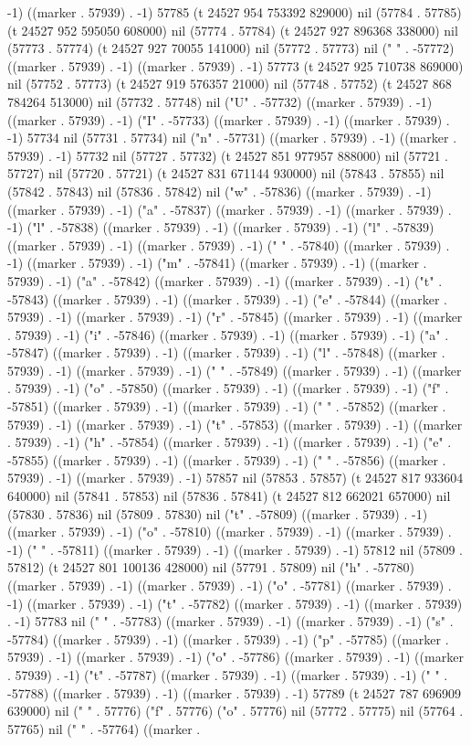 -1) ((marker . 57939) . -1) 57785 (t 24527 954 753392 829000) nil (57784 . 57785) (t 24527 952 595050 608000) nil (57774 . 57784) (t 24527 927 896368 338000) nil (57773 . 57774) (t 24527 927 70055 141000) nil (57772 . 57773) nil (" " . -57772) ((marker . 57939) . -1) ((marker . 57939) . -1) 57773 (t 24527 925 710738 869000) nil (57752 . 57773) (t 24527 919 576357 21000) nil (57748 . 57752) (t 24527 868 784264 513000) nil (57732 . 57748) nil ("U" . -57732) ((marker . 57939) . -1) ((marker . 57939) . -1) ("I" . -57733) ((marker . 57939) . -1) ((marker . 57939) . -1) 57734 nil (57731 . 57734) nil ("n" . -57731) ((marker . 57939) . -1) ((marker . 57939) . -1) 57732 nil (57727 . 57732) (t 24527 851 977957 888000) nil (57721 . 57727) nil (57720 . 57721) (t 24527 831 671144 930000) nil (57843 . 57855) nil (57842 . 57843) nil (57836 . 57842) nil ("w" . -57836) ((marker . 57939) . -1) ((marker . 57939) . -1) ("a" . -57837) ((marker . 57939) . -1) ((marker . 57939) . -1) ("l" . -57838) ((marker . 57939) . -1) ((marker . 57939) . -1) ("l" . -57839) ((marker . 57939) . -1) ((marker . 57939) . -1) (" " . -57840) ((marker . 57939) . -1) ((marker . 57939) . -1) ("m" . -57841) ((marker . 57939) . -1) ((marker . 57939) . -1) ("a" . -57842) ((marker . 57939) . -1) ((marker . 57939) . -1) ("t" . -57843) ((marker . 57939) . -1) ((marker . 57939) . -1) ("e" . -57844) ((marker . 57939) . -1) ((marker . 57939) . -1) ("r" . -57845) ((marker . 57939) . -1) ((marker . 57939) . -1) ("i" . -57846) ((marker . 57939) . -1) ((marker . 57939) . -1) ("a" . -57847) ((marker . 57939) . -1) ((marker . 57939) . -1) ("l" . -57848) ((marker . 57939) . -1) ((marker . 57939) . -1) (" " . -57849) ((marker . 57939) . -1) ((marker . 57939) . -1) ("o" . -57850) ((marker . 57939) . -1) ((marker . 57939) . -1) ("f" . -57851) ((marker . 57939) . -1) ((marker . 57939) . -1) (" " . -57852) ((marker . 57939) . -1) ((marker . 57939) . -1) ("t" . -57853) ((marker . 57939) . -1) ((marker . 57939) . -1) ("h" . -57854) ((marker . 57939) . -1) ((marker . 57939) . -1) ("e" . -57855) ((marker . 57939) . -1) ((marker . 57939) . -1) (" " . -57856) ((marker . 57939) . -1) ((marker . 57939) . -1) 57857 nil (57853 . 57857) (t 24527 817 933604 640000) nil (57841 . 57853) nil (57836 . 57841) (t 24527 812 662021 657000) nil (57830 . 57836) nil (57809 . 57830) nil ("t" . -57809) ((marker . 57939) . -1) ((marker . 57939) . -1) ("o" . -57810) ((marker . 57939) . -1) ((marker . 57939) . -1) (" " . -57811) ((marker . 57939) . -1) ((marker . 57939) . -1) 57812 nil (57809 . 57812) (t 24527 801 100136 428000) nil (57791 . 57809) nil ("h" . -57780) ((marker . 57939) . -1) ((marker . 57939) . -1) ("o" . -57781) ((marker . 57939) . -1) ((marker . 57939) . -1) ("t" . -57782) ((marker . 57939) . -1) ((marker . 57939) . -1) 57783 nil (" " . -57783) ((marker . 57939) . -1) ((marker . 57939) . -1) ("s" . -57784) ((marker . 57939) . -1) ((marker . 57939) . -1) ("p" . -57785) ((marker . 57939) . -1) ((marker . 57939) . -1) ("o" . -57786) ((marker . 57939) . -1) ((marker . 57939) . -1) ("t" . -57787) ((marker . 57939) . -1) ((marker . 57939) . -1) (" " . -57788) ((marker . 57939) . -1) ((marker . 57939) . -1) 57789 (t 24527 787 696909 639000) nil (" " . 57776) ("f" . 57776) ("o" . 57776) nil (57772 . 57775) nil (57764 . 57765) nil (" " . -57764) ((marker . 